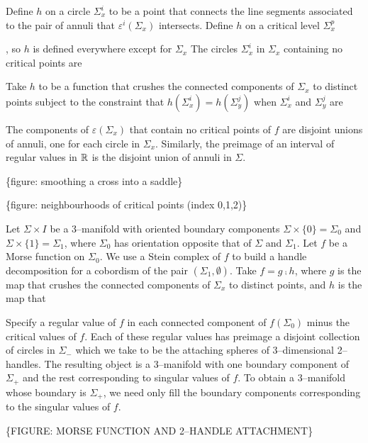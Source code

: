 Define $h$ on a circle $\Sigma_x^i$ to be a point that connects the line segments associated to the pair of annuli that $\varepsilon^i(\Sigma_x)$ intersects.
Define $h$ on a critical level $\Sigma_x^p$ 

, so $h$ is defined everywhere except for $\Sigma_x$
The circles $\Sigma_x^i$ in $\Sigma_x$ containing no critical points are 


Take $h$ to be a function that crushes the connected components of $\Sigma_x$ to distinct points subject to the constraint that $h(\Sigma_x^i)=h(\Sigma_y^j)$ when $\Sigma_x^i$ and $\Sigma_y^j$ are 



The components of $\varepsilon(\Sigma_x)$ that contain no critical points of $f$ are disjoint unions of annuli, one for each circle in $\Sigma_x$.
Similarly, the preimage of an interval of regular values in $\mathbb{R}$ is the disjoint union of annuli in $\Sigma$.

\{figure: smoothing a cross into a saddle\}

\{figure: neighbourhoods of critical points (index 0,1,2)\}



Let $\Sigma\times I$ be a 3--manifold with oriented boundary components $\Sigma\times\{0\}=\Sigma_0$ and $\Sigma\times\{1\}=\Sigma_1$, where $\Sigma_0$ has orientation opposite that of $\Sigma$ and $\Sigma_1$.
Let $f$ be a Morse function on $\Sigma_0$.
We use a Stein complex of $f$ to build a handle decomposition for a cobordism of the pair $(\Sigma_1,\emptyset)$.
Take $f=g\comp h$, where $g$ is the map that crushes the connected components of $\Sigma_x$ to distinct points, and $h$ is the map that 


 Specify a regular value of $f$ in each connected component of $f(\Sigma_0)$ minus the critical values of $f$.
Each of these regular values has preimage a disjoint collection of circles in $\Sigma_-$ which we take to be the attaching spheres of 3--dimensional 2--handles. 
The resulting object is a 3--manifold with one boundary component of $\Sigma_+$ and the rest corresponding to singular values of $f$.
To obtain a 3--manifold whose boundary is $\Sigma_+$, we need only fill the boundary components corresponding to the singular values of $f$.

\{FIGURE: MORSE FUNCTION AND 2--HANDLE ATTACHMENT\}



